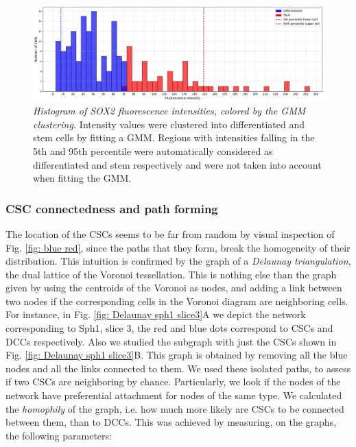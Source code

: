 \documentclass[fleqn,10pt]{wlscirep}
\begin{document}
\begin{figure}
    \centering
    \includegraphics[width=1.0\textwidth]{images/histogram_GMM_clustering_cutting_tails_in_sph_NEW.png}
    \caption{\emph{Histogram of SOX2 fluorescence intensities, colored by the GMM clustering.} Intensity values were clustered into differentiated and stem cells by fitting a GMM. Regions with intensities falling in the 5th  and  95th percentile were automatically considered as differentiated and stem respectively and were not taken into account when fitting the GMM.}
    \label{fig: filtered GMM histogram}
\end{figure}


\subsubsection*{CSC connectedness and path forming} \label{sss: csc connectedness}
The location of the CSCs seems to be far from random by visual inspection of Fig. \ref{fig: blue red}, since the paths that they form, break the homogeneity of their distribution. This intuition is confirmed by the graph of a \emph{Delaunay triangulation}, the dual lattice of the Voronoi tessellation. This is nothing else than the graph given by using the centroids of the Voronoi as nodes, and adding a link between two nodes if the corresponding cells in the Voronoi diagram are neighboring cells. For instance, in Fig. \ref{fig: Delaunay sph1 slice3}A we depict the network corresponding to \textsf{ Sph1, slice 3}, the red and blue dots correspond to CSCs and DCCs respectively. Also we studied the subgraph with just the CSCs shown in Fig. \ref{fig: Delaunay sph1 slice3}B. This graph is obtained by removing all the blue nodes and all the links connected to them. We used these isolated paths, to assess if two CSCs are neighboring by chance. Particularly, we look if the nodes of the network have preferential attachment for nodes of the same type. We calculated the \emph{homophily} of the graph, i.e. how much more likely are CSCs to be connected between them, than to DCCs. This was achieved by measuring, on the graphs, the following parameters:
\end{document}
